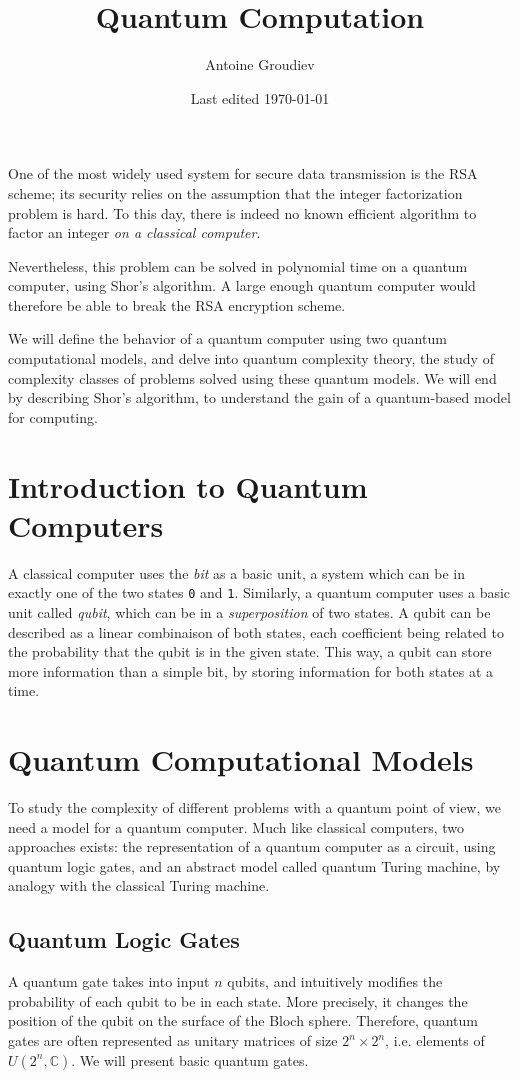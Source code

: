 \documentclass[12pt,a4paper]{article}
\title{\vspace{-3ex} \textbf{Quantum Computation}}
\author{Antoine Groudiev}
\date{\vspace{-1ex}Last edited \today}
\begin{document}
\maketitle
One of the most widely used system for secure data transmission is the RSA scheme; its security relies on the assumption that the integer factorization problem is hard. To this day, there is indeed no known efficient algorithm to factor an integer \textit{on a classical computer}.

Nevertheless, this problem can be solved in polynomial time on a quantum computer, using Shor's algorithm. A large enough quantum computer would therefore be able to break the RSA encryption scheme.

We will define the behavior of a quantum computer using two quantum computational models, and delve into quantum complexity theory, the study of complexity classes of problems solved using these quantum models. We will end by describing Shor's algorithm, to understand the gain of a quantum-based model for computing.

\tableofcontents

\section*{Introduction to Quantum Computers}
A classical computer uses the \emph{bit} as a basic unit, a system which can be in exactly one of the two states \texttt{0} and \texttt{1}. Similarly, a quantum computer uses a basic unit called \emph{qubit}, which can be in a \emph{superposition} of two states. A qubit can be described as a linear combinaison of both states, each coefficient being related to the probability that the qubit is in the given state. This way, a qubit can store more information than a simple bit, by storing information for both states at a time.

\section{Quantum Computational Models}
To study the complexity of different problems with a quantum point of view, we need a model for a quantum computer. Much like classical computers, two approaches exists: the representation of a quantum computer as a circuit, using quantum logic gates, and an abstract model called quantum Turing machine, by analogy with the classical Turing machine.

\subsection{Quantum Logic Gates}
A quantum gate takes into input $n$ qubits, and intuitively modifies the probability of each qubit to be in each state. More precisely, it changes the position of the qubit on the surface of the Bloch sphere. Therefore, quantum gates are often represented as unitary matrices of size $2^n \times 2^n$, i.e. elements of $U(2^n, \mathbb{C})$. We will present basic quantum gates.
\end{document}
